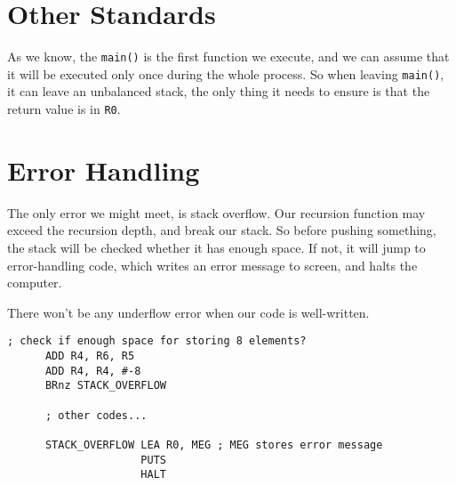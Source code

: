 \documentclass{article}
\begin{document}
	\section{Other Standards}
	As we know, the \texttt{main()} is the first function we execute, and we can assume that it will be executed only once during the whole process. So when leaving \texttt{main()}, it can leave an unbalanced stack, the only thing it needs to ensure is that the return value is in \texttt{R0}.
	\section{Error Handling}
	The only error we might meet, is stack overflow. Our recursion function may exceed the recursion depth, and break our stack. So before pushing something, the stack will be checked whether it has enough space. If not, it will jump to error-handling code, which writes an error message to screen, and halts the computer.
	
	There won't be any underflow error when our code is well-written.
	\begin{lstlisting}[caption={Check stack space example}]
	; check if enough space for storing 8 elements?
	  ADD R4, R6, R5
	  ADD R4, R4, #-8
	  BRnz STACK_OVERFLOW
	  
	  ; other codes...
	  
	  STACK_OVERFLOW LEA R0, MEG ; MEG stores error message
	                 PUTS
	                 HALT
	\end{lstlisting}
\end{document}

